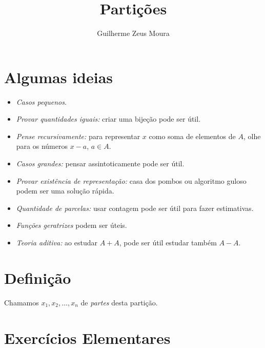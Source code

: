 \documentclass[10pt, a4paper]{article}
\title{Partições}
\author{Guilherme Zeus Moura}
\begin{document}
	
	\zeustitle

	\nocite{PartitionsofIntegers-JLaurendi}
	\nocite{Particoes-CShine}
	\nocite{Particoes-GLucas}
	\nocite{NT-DSantos}
	\nocite{Combinatorics3-YZhao}

	\section*{Algumas ideias}

	\begin{itemize}
		\item \emph{Casos pequenos}.
		\item \emph{Provar quantidades iguais:} criar uma bijeção pode ser útil.
		\item \emph{Pense recursivamente:} para representar $x$ como soma de elementos de $A$, olhe para os números $x - a$, $a \in A$.
		\item \emph{Casos grandes:} pensar assintoticamente pode ser útil.
		\item \emph{Provar existência de representação:} casa dos pombos ou algoritmo guloso podem ser uma solução rápida.
		\item \emph{Quantidade de parcelas:} usar contagem pode ser útil para fazer estimativas.
		\item \emph{Funções geratrizes} podem ser úteis.
		\item \emph{Teoria aditiva:} ao estudar $A + A$, pode ser útil estudar também $A - A$. 
	\end{itemize}

	\section*{Definição}


	Chamamos $x_1, x_2, \dots, x_n$ de \emph{partes} desta partição.

	\section{Exercícios Elementares}
\end{document}
